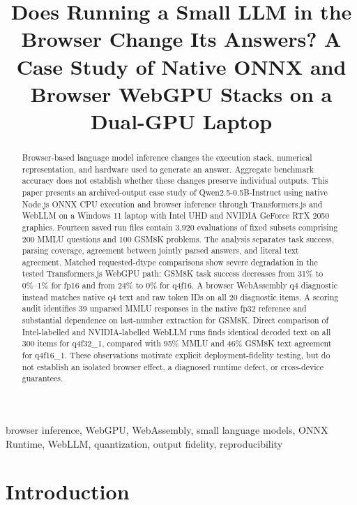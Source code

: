 \documentclass[conference]{IEEEtran}
\title{Does Running a Small LLM in the Browser Change Its Answers? A Case Study of Native ONNX and Browser WebGPU Stacks on a Dual-GPU Laptop}
\author{
\IEEEauthorblockN{Sudip Niroula}
\IEEEauthorblockA{
Independent Researcher\\
Nepal
}
\and
\IEEEauthorblockN{Mandip Pokharel}
\IEEEauthorblockA{
Independent Researcher\\
Nepal
}
}
\begin{document}
\maketitle

\begin{abstract}
Browser-based language model inference changes the execution
stack, numerical representation, and hardware used to generate
an answer. Aggregate benchmark accuracy does not establish
whether these changes preserve individual outputs. This paper
presents an archived-output case study of
Qwen2.5-0.5B-Instruct using native Node.js ONNX CPU execution
and browser inference through Transformers.js and WebLLM on
a Windows 11 laptop with Intel UHD and NVIDIA GeForce
RTX 2050 graphics. Fourteen saved run files contain
3,920 evaluations of fixed subsets comprising 200 MMLU
questions and 100 GSM8K problems. The analysis separates
task success, parsing coverage, agreement between jointly
parsed answers, and literal text agreement. Matched
requested-dtype comparisons show severe degradation in the
tested Transformers.js WebGPU path: GSM8K task success
decreases from 31\% to 0\%--1\% for fp16 and from 24\%
to 0\% for q4f16. A browser WebAssembly q4 diagnostic instead
matches native q4 text and raw token IDs on all
20 diagnostic items. A scoring audit identifies 39 unparsed
MMLU responses in the native fp32 reference and substantial
dependence on last-number extraction for GSM8K. Direct
comparison of Intel-labelled and NVIDIA-labelled WebLLM runs
finds identical decoded text on all 300 items for q4f32\_1,
compared with 95\% MMLU and 46\% GSM8K text agreement for
q4f16\_1. These observations motivate explicit
deployment-fidelity testing, but do not establish an isolated
browser effect, a diagnosed runtime defect, or cross-device
guarantees.
\end{abstract}

\begin{IEEEkeywords}
browser inference, WebGPU, WebAssembly, small language models,
ONNX Runtime, WebLLM, quantization, output fidelity,
reproducibility
\end{IEEEkeywords}


\section{Introduction}
\label{sec:introduction}
\end{document}
